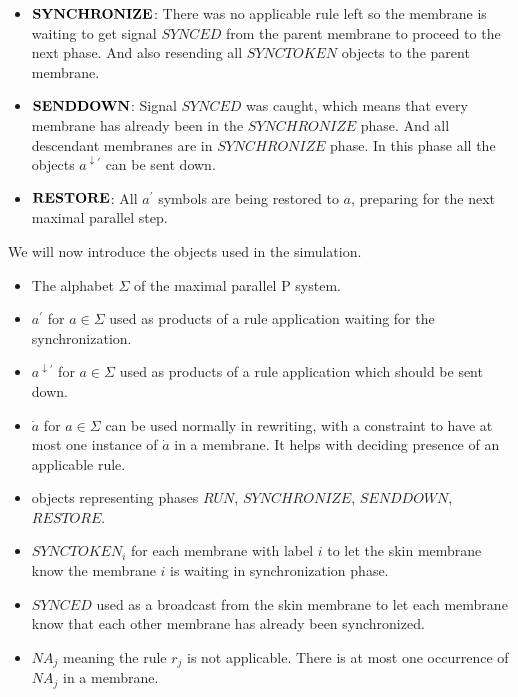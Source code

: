 \begin{dokaz}
\begin{itemize}
    \item $\mathit{\bf SYNCHRONIZE}$: There was no applicable rule left so the membrane is waiting to get signal $\mathit{SYNCED}$ from the parent membrane to proceed to the next phase. And also resending all $\mathit{SYNCTOKEN}$ objects to the parent membrane.

    \item $\mathit{\bf SENDDOWN}$: Signal $\mathit{SYNCED}$ was caught, which means that every membrane has already been in the $\mathit{SYNCHRONIZE}$ phase. And all descendant membranes are in $\mathit{SYNCHRONIZE}$ phase. In this phase all the objects $a^{\downarrow\prime}$ can be sent down.

    \item $\mathit{\bf RESTORE}$: All $a^{\prime}$ symbols are being restored to $a$, preparing for the next maximal parallel step.
  \end{itemize}


  We will now introduce the objects used in the simulation.
  
  \begin{itemize}
    \item The alphabet $\Sigma$ of the maximal parallel P system.
    \item $a^\prime$ for $a\in\Sigma$ used as products of a rule application waiting for the synchronization.
    \item $a^{\downarrow\prime}$ for $a\in\Sigma$ used as products of a rule application which should be sent down. 
    \item $\dot{a}$ for $a\in\Sigma$ can be used normally in rewriting, with a constraint to have at most one instance of $\dot{a}$ in a membrane. It helps with deciding presence of an applicable rule. 
    \item objects representing phases $\mathit{RUN}$, $\mathit{SYNCHRONIZE}$, $\mathit{SENDDOWN}$, $\mathit{RESTORE}$.
    \item $SYNCTOKEN_i$ for each membrane with label $i$ to let the skin membrane know the membrane $i$ is waiting in synchronization phase.
    \item $SYNCED$ used as a broadcast from the skin membrane to let each membrane know that each other membrane has already been synchronized.
    \item $NA_j$ meaning the rule $r_j$ is not applicable. There is at most one occurrence of $NA_j$ in a membrane.
  \end{itemize}


\end{dokaz}
